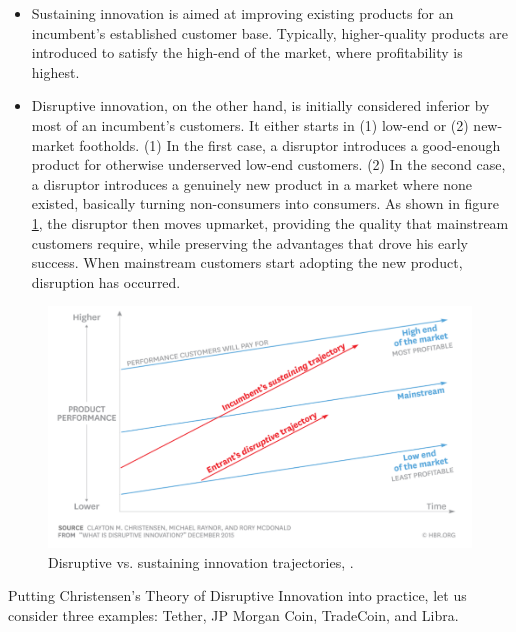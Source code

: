 \documentclass[conference]{IEEEtran}
\begin{document}
\begin{itemize}
	\item Sustaining innovation is aimed at improving existing products for an incumbent's established customer base. Typically, higher-quality products are introduced to satisfy the high-end of the market, where profitability is highest.
	\item Disruptive innovation, on the other hand, is initially considered inferior by most of an incumbent’s customers. It either starts in (1) low-end or (2) new-market footholds. (1) In the first case, a disruptor introduces a good-enough product for otherwise underserved low-end customers. (2) In the second case, a disruptor introduces a genuinely new product in a market where none existed, basically turning non-consumers into consumers. As shown in figure \ref{fig:disruption}, the disruptor then moves upmarket, providing the quality that mainstream customers require, while preserving the advantages that drove his early success. When mainstream customers start adopting the new product, disruption has occurred.
\end{itemize}

\begin{figure}[htbp]
	\centerline{
		\includegraphics[width=\linewidth]{disruptiveInnovation.png}
		}
	\caption{Disruptive vs. sustaining innovation trajectories, \cite{Christensen}.}
	\label{fig:disruption}
\end{figure}

Putting Christensen's Theory of Disruptive Innovation into practice, let us consider three examples: Tether, JP Morgan Coin, TradeCoin, and Libra.
\end{document}
